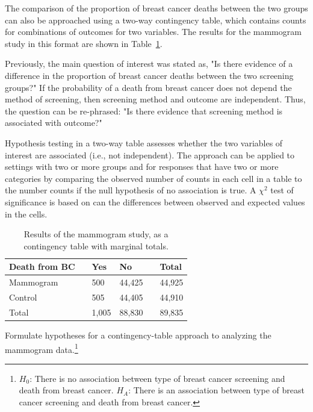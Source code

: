 The comparison of the proportion of breast cancer deaths between the two groups can also be approached using a two-way contingency table, which contains counts for combinations of outcomes for two variables. The results for the mammogram study in this format are shown in Table~\ref{mammogramStudySummaryTableWithTotals}.

Previously, the main question of interest was stated as, "Is there evidence of a difference in the proportion of breast cancer deaths between the two screening groups?" If the probability of a death from breast cancer does not depend the method of screening, then screening method and outcome are independent. Thus, the question can be re-phrased: "Is there evidence that screening method is associated with outcome?"

Hypothesis testing in a two-way table assesses whether the two variables of interest are associated (i.e., not independent). The approach can be applied to settings with two or more groups and for responses that have two or more categories by comparing the observed number of counts in each cell in a table to the  number counts if the null hypothesis of no association is true. A $\chi^2$ test of significance is based on can the differences between observed and expected values in the cells.

\begin{table}[h]
	\centering
	\begin{tabular}{l| l l l l |l}
		\hline
		Death from BC & \hspace{1mm}  & Yes & No & \hspace{1mm} & Total \\
		\hline
		Mammogram				   &    & 500 & 44,425 & 				&44,925 \\
		Control				   &     & 505	& 44,405    &				& 44,910 \\
		\hline
		Total						   &    & 1,005 & 88,830 & 				& 89,835 \\
		\hline
	\end{tabular}
	\caption{Results of the mammogram study, as a contingency table with marginal totals.}
	\label{mammogramStudySummaryTableWithTotals}
\end{table}

\begin{exercise}Formulate hypotheses for a contingency-table approach to analyzing the mammogram data.\footnote{$H_0$: There is no association between type of breast cancer screening and death from breast cancer. $H_A$: There is an association between type of breast cancer screening and death from breast cancer.}

\end{exercise}

